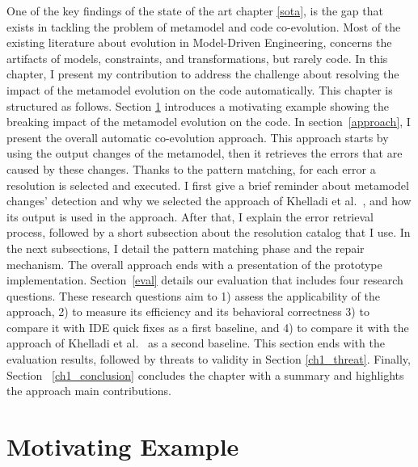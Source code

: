 One of the key findings of the state of the art chapter \ref{sota}, is the gap that exists in tackling the problem of metamodel and code co-evolution. Most of the existing literature about evolution in Model-Driven Engineering, concerns the artifacts of models, constraints, and transformations, but rarely code. In this chapter, I present my contribution to address the challenge  about resolving the impact of the metamodel evolution on the code automatically. 
This chapter is structured as follows. Section \ref{example} introduces a motivating example showing the breaking impact of the metamodel evolution on the code. 
In section~\ref{approach}, I present the overall automatic co-evolution approach. This approach starts by using the output changes of the metamodel, then it retrieves the errors that are caused by these changes. Thanks to the pattern matching, for each error a resolution is selected and executed. I first give a brief reminder about metamodel changes' detection and why we selected the approach of Khelladi et al.~\cite{khelladi2016detecting}, and how its output is used in the approach. After that, I explain the error retrieval process, followed by a short subsection about the resolution catalog that I use. In the next subsections, I detail the pattern matching phase and the repair mechanism. The overall approach ends with a presentation of the prototype implementation.
Section~\ref{eval} details our evaluation that includes four research questions. These research questions aim to 1) assess the applicability of the approach, 2) to measure its efficiency and its behavioral correctness 3) to compare it with IDE quick fixes as a first baseline, and 4) to compare it with the approach of Khelladi et al.~\cite{Khelladi2020} as a second baseline. This section ends with the evaluation results, followed by threats to validity in Section \ref{ch1_threat}. Finally, Section~ \ref{ch1_conclusion} concludes the chapter with a summary and highlights the approach main contributions. %

\label{sec: ap1_changedetection}

\section{Motivating Example}\label{example}

